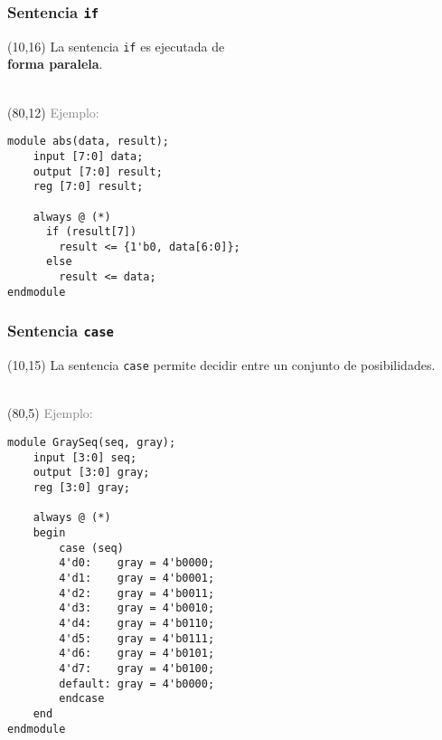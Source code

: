 \documentclass[aspectratio=169]{beamer}
\begin{document}
\begin{frame}[fragile,t]
    \frametitle{Sentencia \texttt{if}}
    \begin{textblock}{65}(10,16)
    La sentencia \texttt{if} es ejecutada de\\ \textbf{forma paralela}.\\
    \bigskip
    \\
    \bigskip
    \end{textblock}
    \begin{textblock}{70}(80,12)
    \textcolor{gray}{Ejemplo:}\\
\begin{lstlisting}
module abs(data, result);
    input [7:0] data;
    output [7:0] result;
    reg [7:0] result;

    always @ (*)
      if (result[7])
        result <= {1'b0, data[6:0]};
      else
        result <= data;
endmodule
\end{lstlisting}
    \end{textblock}
\end{frame}

\begin{frame}[fragile,t]
    \frametitle{Sentencia \texttt{case}}
    \begin{textblock}{60}(10,15)
    La sentencia \texttt{case} permite decidir entre un conjunto de posibilidades.\\
    \bigskip
    \\
    \bigskip
    \end{textblock}
    \begin{textblock}{65}(80,5)
    \textcolor{gray}{Ejemplo:}\\
\begin{lstlisting}
module GraySeq(seq, gray);
    input [3:0] seq;
    output [3:0] gray;
    reg [3:0] gray;

    always @ (*)
    begin
        case (seq)
        4'd0:    gray = 4'b0000;
        4'd1:    gray = 4'b0001;
        4'd2:    gray = 4'b0011;
        4'd3:    gray = 4'b0010;
        4'd4:    gray = 4'b0110;
        4'd5:    gray = 4'b0111;
        4'd6:    gray = 4'b0101;
        4'd7:    gray = 4'b0100;
        default: gray = 4'b0000;
        endcase
    end
endmodule
\end{lstlisting}
    \end{textblock}
\end{frame}
\end{document}
